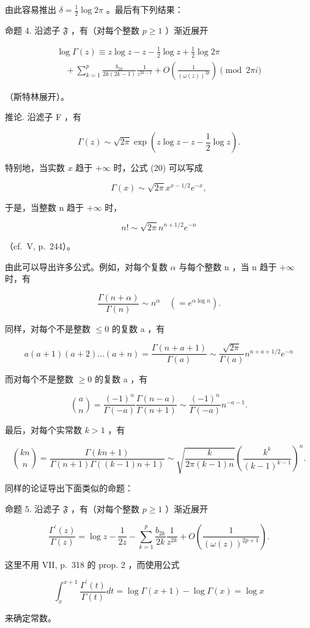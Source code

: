由此容易推出 \(\delta = \frac{1}{2}\log 2\pi\) 。最后有下列结果：

命题 4. 沿滤子 \(\mathfrak{F}\) ，有（对每个整数 \(p \geqslant 1\) ）渐近展开

\[
\begin{array}{l} \log \Gamma (z) \equiv z \log z - z - \frac {1}{2} \log z + \frac {1}{2} \log 2 \pi \\ \quad + \sum_ {k = 1} ^ {p} \frac {b _ {2 k}}{2 k (2 k - 1)} \frac {1}{z ^ {2 k - 1}} + O \left(\frac {1}{(\omega (z)) ^ {2 p}}\right) \pmod {2 \pi i} \end{array}\tag{19}
\]

（斯特林展开）。

推论. 沿滤子 F ，有

\[
\Gamma (z) \sim \sqrt {2 \pi} \exp (z \log z - z - \frac {1}{2} \log z).\tag{20}
\]

特别地，当实数 \(x\) 趋于 \(+\infty\) 时，公式 (20) 可以写成

\[
\Gamma (x) \sim \sqrt {2 \pi} x ^ {x - 1 / 2} e ^ {- x},\tag{21}
\]

于是，当整数 n 趋于 \(+\infty\) 时，

\[
n! \sim \sqrt {2 \pi} n ^ {n + 1 / 2} e ^ {- n}
\]

（cf.~V, p.~244）。

由此可以导出许多公式。例如，对每个复数 \(\alpha\) 与每个整数 n ，当 n 趋于 \(+\infty\) 时，有

\[
\frac {\Gamma (n + \alpha)}{\Gamma (n)} \sim n ^ {\alpha} \quad (= e ^ {\alpha \log n}).\tag{22}
\]

同样，对每个不是整数 \(\leqslant 0\) 的复数 a ，有

\[
a (a + 1) (a + 2) \dots (a + n) = \frac {\Gamma (n + a + 1)}{\Gamma (a)} \sim \frac {\sqrt {2 \pi}}{\Gamma (a)} n ^ {n + a + 1 / 2} e ^ {- n}\tag{23}
\]

而对每个不是整数 \(\geqslant 0\) 的复数 a ，有

\[
\binom {a} {n} = \frac {(- 1) ^ {n}}{\Gamma (- a)}   \frac {\Gamma (n - a)}{\Gamma (n + 1)} \sim \frac {(- 1) ^ {n}}{\Gamma (- a)}   n ^ {- a - 1}.\tag{24}
\]

最后，对每个实常数 \(k > 1\) ，有

\[
\binom {k n} {n} = \frac {\Gamma (k n + 1)}{\Gamma (n + 1)   \Gamma ((k - 1) n + 1)} \sim \sqrt {\frac {k}{2 \pi (k - 1) n}} \left(\frac {k ^ {k}}{(k - 1) ^ {k - 1}}\right) ^ {n}.\tag{25}
\]

同样的论证导出下面类似的命题：

命题 5. 沿滤子 \(\mathfrak{F}\) ，有（对每个整数 \(p \geqslant 1\) ）渐近展开

\[
\frac {\Gamma^ {\prime} (z)}{\Gamma (z)} = \log z - \frac {1}{2 z} - \sum_ {k = 1} ^ {p} \frac {b _ {2 k}}{2 k} \frac {1}{z ^ {2 k}} + O \left(\frac {1}{(\omega (z)) ^ {2 p + 1}}\right).\tag{26}
\]

这里不用 VII, p.~318 的 prop. 2 ，而使用公式

\[
\int_ {x} ^ {x + 1} \frac {\Gamma^ {\prime} (t)}{\Gamma (t)} d t = \log \Gamma (x + 1) - \log \Gamma (x) = \log x
\]

来确定常数。

\setcounter{exercisegroup}{0}
